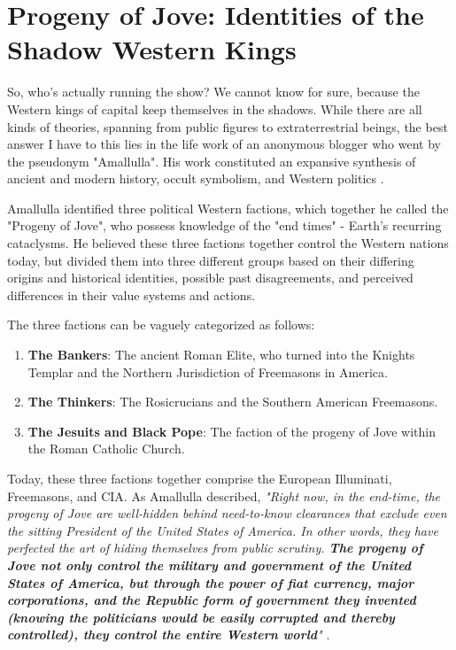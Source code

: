 \documentclass[10pt,twocolumn,letterpaper]{article}
\begin{document}
\section{Progeny of Jove: Identities of the Shadow Western Kings}

So, who's actually running the show? We cannot know for sure, because the Western kings of capital keep themselves in the shadows. While there are all kinds of theories, spanning from public figures to extraterrestrial beings, the best answer I have to this lies in the life work of an anonymous blogger who went by the pseudonym "Amallulla". His work constituted an expansive synthesis of ancient and modern history, occult symbolism, and Western politics \cite{33,34}.

Amallulla identified three political Western factions, which together he called the "Progeny of Jove", who possess knowledge of the "end times" - Earth's recurring cataclysms. He believed these three factions together control the Western nations today, but divided them into three different groups based on their differing origins and historical identities, possible past disagreements, and perceived differences in their value systems and actions.

The three factions can be vaguely categorized as follows:

\begin{flushleft}
\begin{enumerate}
    \item \textbf{The Bankers}: The ancient Roman Elite, who turned into the Knights Templar and the Northern Jurisdiction of Freemasons in America.
    \item \textbf{The Thinkers}: The Rosicrucians and the Southern American Freemasons.
    \item \textbf{The Jesuits and Black Pope}: The faction of the progeny of Jove within the Roman Catholic Church.
\end{enumerate}
\end{flushleft}

Today, these three factions together comprise the European Illuminati, Freemasons, and CIA. As Amallulla described, \textit{"Right now, in the end-time, the progeny of Jove are well-hidden behind need-to-know clearances that exclude even the sitting President of the United States of America. In other words, they have perfected the art of hiding themselves from public scrutiny. \textbf{The progeny of Jove not only control the military and government of the United States of America, but through the power of fiat currency, major corporations, and the Republic form of government they invented (knowing the politicians would be easily corrupted and thereby controlled), they control the entire Western world}"} \cite{33,34}.
\end{document}
